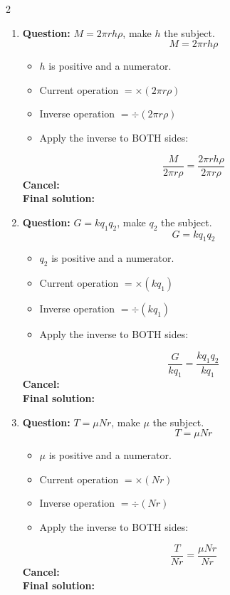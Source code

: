 \documentclass[11pt]{article}
\begin{document}
\begin{multicols}{2}
\begin{enumerate}[leftmargin=*, itemsep=10pt]
\columnbreak
\item \textbf{Question:} \( M = 2\pi r h \rho \), make \( h \) the subject.
\[
M=2\pi r h \rho
\]
\begin{itemize}[leftmargin=*, itemsep=2pt]
\item \(h\) is positive and a numerator.
\item Current operation \(= \times (2\pi r\rho)\)
\item Inverse operation \(= \div (2\pi r\rho)\)
\item Apply the inverse to BOTH sides:
\end{itemize}
\[
\frac{M}{2\pi r\rho}=\frac{2\pi r h \rho}{2\pi r\rho}
\]
\textbf{Cancel:} \\[1.5cm]
\textbf{Final solution:}\\[1.5cm]

\item \textbf{Question:} \( G = kq_{1}q_{2} \), make \( q_{2} \) the subject.
\[
G=kq_{1}q_{2}
\]
\begin{itemize}[leftmargin=*, itemsep=2pt]
\item \(q_{2}\) is positive and a numerator.
\item Current operation \(= \times (kq_{1})\)
\item Inverse operation \(= \div (kq_{1})\)
\item Apply the inverse to BOTH sides:
\end{itemize}
\[
\frac{G}{kq_{1}}=\frac{kq_{1}q_{2}}{kq_{1}}
\]
\textbf{Cancel:} \\[1.5cm]
\textbf{Final solution:}\\[1.5cm]

\newpage
\item \textbf{Question:} \( T = \mu Nr \), make \( \mu \) the subject.
\[
T=\mu Nr
\]
\begin{itemize}[leftmargin=*, itemsep=2pt]
\item \(\mu\) is positive and a numerator.
\item Current operation \(= \times (Nr)\)
\item Inverse operation \(= \div (Nr)\)
\item Apply the inverse to BOTH sides:
\end{itemize}
\[
\frac{T}{Nr}=\frac{\mu Nr}{Nr}
\]
\textbf{Cancel:} \\[1.5cm]
\textbf{Final solution:}\\[1.5cm]


\end{enumerate}
\end{multicols}
\end{document}
